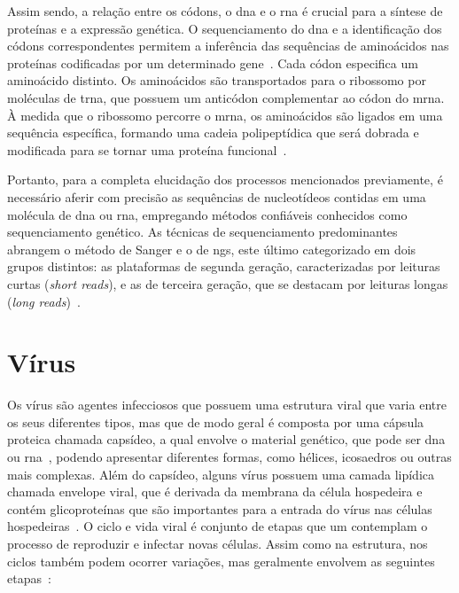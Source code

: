 Assim sendo, a relação entre os códons, o \gls{dna} e o \gls{rna} é crucial para a síntese de proteínas e a expressão genética. O sequenciamento do \gls{dna} e a identificação dos códons correspondentes permitem a inferência das sequências de aminoácidos nas proteínas codificadas por um determinado gene~\cite{alberts_biologia_2017}.
Cada códon especifica um aminoácido distinto. Os aminoácidos são transportados para o ribossomo por moléculas de \gls{trna}, que possuem um anticódon complementar ao códon do \gls{mrna}. À medida que o ribossomo percorre o \gls{mrna}, os aminoácidos são ligados em uma sequência específica, formando uma cadeia polipeptídica que será dobrada e modificada para se tornar uma proteína funcional~\cite{alberts_biologia_2017}.

Portanto, para a completa elucidação dos processos mencionados previamente, é necessário aferir com precisão as sequências de nucleotídeos contidas em uma molécula de \gls{dna} ou \gls{rna}, empregando métodos confiáveis conhecidos como sequenciamento genético. As técnicas de sequenciamento predominantes abrangem o método de Sanger e o de \gls{ngs}, este último categorizado em dois grupos distintos: as plataformas de segunda geração, caracterizadas por leituras curtas (\textit{short reads}), e as de terceira geração, que se destacam por leituras longas (\textit{long reads})~\cite{nanopore_sequence_jain_2016,dna_sequence_sanger_1977,next_generation_sequence_goodwin_2016}.

\section{Vírus}

Os vírus são agentes infecciosos que possuem uma estrutura viral que varia entre os seus diferentes tipos, mas que de modo geral é composta por uma cápsula proteica chamada capsídeo, a qual envolve o material genético, que pode ser \gls{dna} ou \gls{rna}~\cite{david_virology_2022}, podendo apresentar diferentes formas, como hélices, icosaedros ou outras mais complexas. Além do capsídeo, alguns vírus possuem uma camada lipídica chamada envelope viral, que é derivada da membrana da célula hospedeira e contém glicoproteínas que são importantes para a entrada do vírus nas células hospedeiras~\cite{david_virology_2022, alberts_molecular_2002}.
O ciclo e vida viral é conjunto de etapas que um contemplam o processo de reproduzir e infectar novas células. Assim como na estrutura, nos ciclos também podem ocorrer variações, mas geralmente envolvem as seguintes etapas~\cite{alberts_molecular_2002}:

